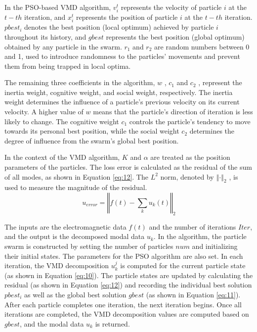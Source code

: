 \documentclass[3p,authoryear,preprint,12pt]{elsarticle}
\begin{document}
In the PSO-based VMD algorithm, $v_{i}^t$  represents the velocity of particle $i$  at the  $t-th$ iteration, and $x_i^t$  represents the position of particle $i$  at the  $t-th$ iteration. $pbest_{i}$  denotes the best position (local optimum) achieved by particle  $i$ throughout its history, and $gbest$  represents the best position (global optimum) obtained by any particle in the swarm. $r_1$ and $r_2$  are random numbers between 0 and 1, used to introduce randomness to the particles' movements and prevent them from being trapped in local optima.

The remaining three coefficients in the algorithm, $w$ , $c_1$  and $c_2$ , represent the inertia weight, cognitive weight, and social weight, respectively. The inertia weight   determines the influence of a particle's previous velocity on its current velocity. A higher value of $w$  means that the particle's direction of iteration is less likely to change. The cognitive weight $c_1$  controls the particle's tendency to move towards its personal best position, while the social weight  $c_2$ determines the degree of influence from the swarm's global best position.

In the context of the VMD algorithm, $K$  and $\alpha$  are treated as the position parameters of the particles. The loss error is calculated as the residual of the sum of all modes, as shown in Equation \ref{eq:12}. The  $L^2$ norm, denoted by $\left\Vert\cdot\right\Vert_2$ , is used to measure the magnitude of the residual.
\begin{equation}
	\label{eq:12}
	\displaystyle
	u_{error} = \left\Vert f(t) - \sum_k u_k(t) \right\Vert_2
\end{equation}

The inputs are the electromagnetic data $f(t)$  and the number of iterations $Iter$, and the output is the decomposed modal data $u_k$. In the algorithm, the particle swarm is constructed by setting the number of particles $num$  and initializing their initial states. The parameters for the PSO algorithm are also set. In each iteration, the VMD decomposition $u_k^j$  is computed for the current particle state (as shown in Equation \ref{eq:10}). The particle states are updated by calculating the residual (as shown in Equation \ref{eq:12}) and recording the individual best solution $pbest_{i}$  as well as the global best solution $gbest$  (as shown in Equation \ref{eq:11}). After each particle completes one iteration, the next iteration begins. Once all iterations are completed, the VMD decomposition values are computed based on $gbest$, and the modal data $u_k$  is returned.
\end{document}
